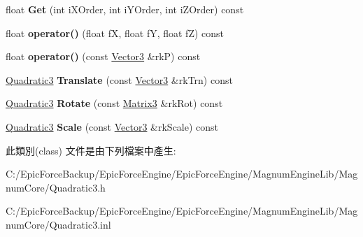 \begin{DoxyCompactItemize}
\item 
float {\bfseries Get} (int i\+X\+Order, int i\+Y\+Order, int i\+Z\+Order) const \hypertarget{class_magnum_1_1_quadratic3_a10728bfc6464745bdd09386a4bdb4a13}{}\label{class_magnum_1_1_quadratic3_a10728bfc6464745bdd09386a4bdb4a13}

\item 
float {\bfseries operator()} (float fX, float fY, float fZ) const \hypertarget{class_magnum_1_1_quadratic3_aab978017370a8c8b477ea2bb345ec33c}{}\label{class_magnum_1_1_quadratic3_aab978017370a8c8b477ea2bb345ec33c}

\item 
float {\bfseries operator()} (const \hyperlink{class_magnum_1_1_vector3}{Vector3} \&rkP) const \hypertarget{class_magnum_1_1_quadratic3_ac59a26b0a9fcb9086ffee42f3ba2bcb7}{}\label{class_magnum_1_1_quadratic3_ac59a26b0a9fcb9086ffee42f3ba2bcb7}

\item 
\hyperlink{class_magnum_1_1_quadratic3}{Quadratic3} {\bfseries Translate} (const \hyperlink{class_magnum_1_1_vector3}{Vector3} \&rk\+Trn) const \hypertarget{class_magnum_1_1_quadratic3_a91f3620744835c35b41366aa221a0971}{}\label{class_magnum_1_1_quadratic3_a91f3620744835c35b41366aa221a0971}

\item 
\hyperlink{class_magnum_1_1_quadratic3}{Quadratic3} {\bfseries Rotate} (const \hyperlink{class_magnum_1_1_matrix3}{Matrix3} \&rk\+Rot) const \hypertarget{class_magnum_1_1_quadratic3_adcbc9d302ba48b2dcef7afd119130e81}{}\label{class_magnum_1_1_quadratic3_adcbc9d302ba48b2dcef7afd119130e81}

\item 
\hyperlink{class_magnum_1_1_quadratic3}{Quadratic3} {\bfseries Scale} (const \hyperlink{class_magnum_1_1_vector3}{Vector3} \&rk\+Scale) const \hypertarget{class_magnum_1_1_quadratic3_a21cc78d9647509a43f99dbcba13477e0}{}\label{class_magnum_1_1_quadratic3_a21cc78d9647509a43f99dbcba13477e0}

\end{DoxyCompactItemize}


此類別(class) 文件是由下列檔案中產生\+:\begin{DoxyCompactItemize}
\item 
C\+:/\+Epic\+Force\+Backup/\+Epic\+Force\+Engine/\+Epic\+Force\+Engine/\+Magnum\+Engine\+Lib/\+Magnum\+Core/Quadratic3.\+h\item 
C\+:/\+Epic\+Force\+Backup/\+Epic\+Force\+Engine/\+Epic\+Force\+Engine/\+Magnum\+Engine\+Lib/\+Magnum\+Core/Quadratic3.\+inl\end{DoxyCompactItemize}
